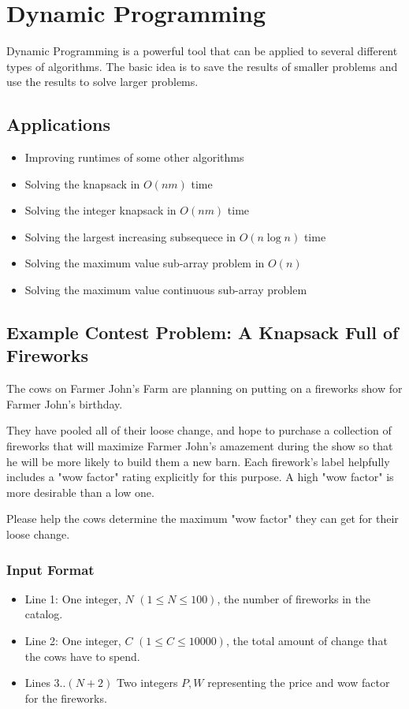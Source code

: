 \section{Dynamic Programming}
Dynamic Programming is a powerful tool that can be applied to several different types of algorithms.\cite{dppractice}
The basic idea is to save the results of smaller problems and use the results to solve larger problems.

\subsection{Applications}
\begin{itemize}
	\item	Improving runtimes of some other algorithms
	\item	Solving the knapsack in $O(nm)$ time
	\item	Solving the integer knapsack in $O(nm)$ time
	\item	Solving the largest increasing subsequece in $O(n \log n)$ time
	\item	Solving the maximum value sub-array problem in $O(n)$
	\item	Solving the maximum value continuous sub-array problem
\end{itemize}

\subsection{Example Contest Problem: A Knapsack Full of Fireworks}
The cows on Farmer John's Farm are planning on putting on a fireworks show for Farmer John's birthday.

They have pooled all of their loose change, and hope to purchase a collection of fireworks that will maximize  Farmer John's amazement during the show so that he will be more likely to build them a new barn.
Each firework's label helpfully includes a "wow factor" rating explicitly for this purpose.
A high "wow factor" is more desirable than a low one.

Please help the cows determine the maximum "wow factor" they can get for their loose change.

\subsubsection{Input Format}
\begin{itemize}
	\item Line 1: One integer, $N$ $(1 \leq N \leq 100)$, the number of fireworks in the catalog.
   \item Line 2: One integer, $C$ $(1 \leq C \leq 10000)$, the total amount of change that the cows have to spend.
	\item Lines 3..$(N+2)$ Two integers $P,W$ representing the price and wow factor for the fireworks.
\end{itemize}

